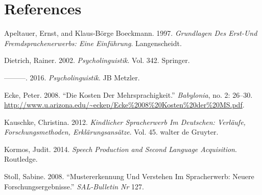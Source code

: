 \documentclass[
  letterpaper,
]{scrbook}
\newlength{\cslhangindent}
\newlength{\cslentryspacingunit} %
\newenvironment{CSLReferences}[2] %
 {%
  \setlength{\parindent}{0pt}
  \ifodd #1
  \let\oldpar\par
  \def\par{\hangindent=\cslhangindent\oldpar}
  \fi
  \setlength{\parskip}{#2\cslentryspacingunit}
 }%
 {}
\begin{document}

\hypertarget{references}{%
\chapter*{References}\label{references}}


\hypertarget{refs}{}
\begin{CSLReferences}{1}{0}
\leavevmode{}%
Apeltauer, Ernst, and Klaus-Börge Boeckmann. 1997. \emph{Grundlagen Des
Erst-Und Fremdsprachenerwerbs: Eine Einf{ü}hrung}. Langenscheidt.

\leavevmode{}%
Dietrich, Rainer. 2002. \emph{Psycholinguistik}. Vol. 342. Springer.

\leavevmode{}%
---------. 2016. \emph{Psycholinguistik}. JB Metzler.

\leavevmode{}%
Ecke, Peter. 2008. {``Die Kosten Der Mehrsprachigkeit.''}
\emph{Babylonia}, no. 2: 26--30.
\url{http://www.u.arizona.edu/~eckep/Ecke\%2008\%20Kosten\%20der\%20MS.pdf}.

\leavevmode{}%
Kauschke, Christina. 2012. \emph{Kindlicher Spracherwerb Im Deutschen:
Verl{ä}ufe, Forschungsmethoden, Erkl{ä}rungsans{ä}tze}. Vol. 45. walter
de Gruyter.

\leavevmode{}%
Kormos, Judit. 2014. \emph{Speech Production and Second Language
Acquisition}. Routledge.

\leavevmode{}%
Stoll, Sabine. 2008. {``Mustererkennung Und Verstehen Im Spracherwerb:
Neuere Forschungsergebnisse.''} \emph{SAL-Bulletin Nr} 127.

\end{CSLReferences}


\backmatter

\printindex
\end{document}
